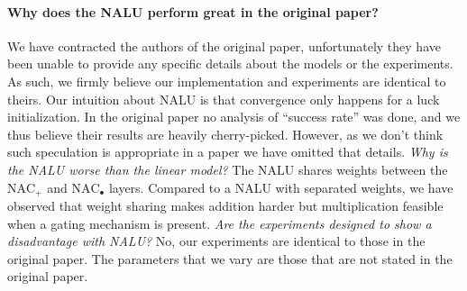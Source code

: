 \documentclass{article}
\begin{document}

\paragraph{Why does the NALU perform great in the original paper?} %
We have contracted the authors of the original paper, unfortunately they have been unable to provide any specific details about the models or the experiments. As such, we firmly believe our implementation and experiments are identical to theirs. Our intuition about NALU is that convergence only happens for a luck initialization. In the original paper no analysis of ``success rate'' was done, and we thus believe their results are heavily cherry-picked. However, as we don't think such speculation is appropriate in a paper we have omitted that details. %
\textit{Why is the NALU worse than the linear model?} The NALU shares weights between the $\mathrm{NAC}_{+}$ and $\mathrm{NAC}_{\bullet}$ layers. Compared to a NALU with separated weights, we have observed that weight sharing makes addition harder but multiplication feasible when a gating mechanism is present. %
\textit{Are the experiments designed to show a disadvantage with NALU?} No, our experiments are identical to those in the original paper. The parameters that we vary are those that are not stated in the original paper.
\end{document}
